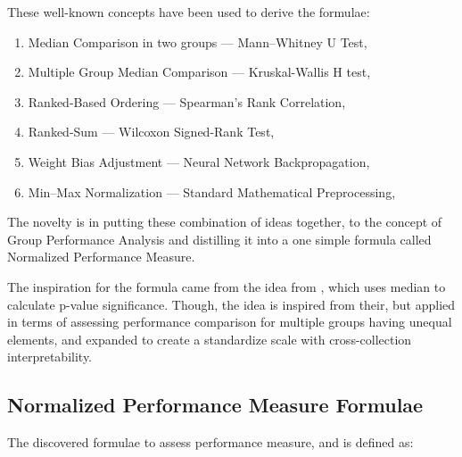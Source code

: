 \documentclass[a4paper,fleqn,review]{cas-sc}
\newcommand{\ldash}{--- }
\begin{document}
These well-known concepts have been used to derive the formulae:
\begin{enumerate}[i]
\item Median Comparison in two groups \ldash Mann–Whitney U Test, \cite{mann1947test}
\item Multiple Group Median Comparison \ldash Kruskal-Wallis H test, \cite{kruskal1952use}
\item Ranked-Based Ordering \ldash Spearman’s Rank Correlation, \cite{spearman1904proof}
\item Ranked-Sum \ldash Wilcoxon Signed-Rank Test, \cite{wilcoxon1945individual}
\item Weight Bias Adjustment \ldash Neural Network Backpropagation, \cite{goodfellow2016deep}
\item Min–Max Normalization \ldash Standard Mathematical Preprocessing, \cite{han2011data}
\end{enumerate}
The novelty is in putting these combination of ideas together, to the concept of Group Performance Analysis and distilling it into a one simple formula called Normalized Performance Measure.

The inspiration for the formula came from the idea from \cite{mann1947test}, which uses median to calculate p-value significance. Though, the idea is inspired from their, but applied in terms of assessing performance comparison for multiple groups having unequal elements, and expanded to create a standardize scale with cross-collection interpretability.

\subsection{Normalized Performance Measure Formulae} 
The discovered formulae to assess performance measure, and is defined as:
\end{document}
